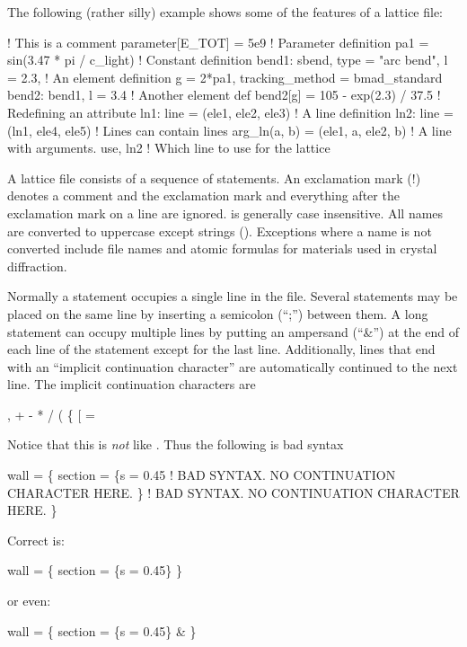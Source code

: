 The following (rather silly) example shows some of the features of a
\bmad lattice file:
\begin{example}
  ! This is a comment
  parameter[E_TOT] = 5e9                   ! Parameter definition
  pa1 = sin(3.47 * pi / c_light)                 ! Constant definition
  bend1: sbend, type = "arc bend", l = 2.3,      ! An element definition
      g = 2*pa1, tracking_method = bmad_standard
  bend2: bend1, l = 3.4                          ! Another element def
  bend2[g] = 105 - exp(2.3) / 37.5               ! Redefining an attribute
  ln1: line = (ele1, ele2, ele3)                 ! A line definition
  ln2: line = (ln1, ele4, ele5)                  ! Lines can contain lines
  arg_ln(a, b) = (ele1, a, ele2, b)              ! A line with arguments.
  use, ln2                                       ! Which line to use for the lattice
\end{example}

A \bmad lattice file consists of a sequence of statements. An
exclamation mark (!) denotes a comment and the exclamation mark and
everything after the exclamation mark on a line are ignored.  \bmad is
generally case insensitive. All names are converted to uppercase
except strings (). Exceptions where a name is not
converted include file names and atomic formulas for materials used in
crystal diffraction.

Normally a statement occupies a single line in the file. Several
statements may be placed on the same line by inserting a semicolon
(``;'') between them. A long statement can occupy multiple lines by
putting an ampersand (``\&'') at the end of each line of the statement
except for the last line. Additionally, lines that end with an
``implicit continuation character''
are automatically continued to the next line. The implicit continuation 
characters are
\begin{example}
  ,   +   -   *   /   (   \{   [   =
\end{example}
Notice
that this is {\em not} like . Thus the following is bad syntax
\begin{example}
  wall = \{
    section = \{s = 0.45     ! BAD SYNTAX. NO CONTINUATION CHARACTER HERE.
    \}                       ! BAD SYNTAX. NO CONTINUATION CHARACTER HERE.
  \}
\end{example}
Correct is:
\begin{example}
  wall = \{
    section = \{s = 0.45\} \}
\end{example}
or even:
\begin{example}
  wall = \{
    section = \{s = 0.45\} \&
  \}
\end{example}

